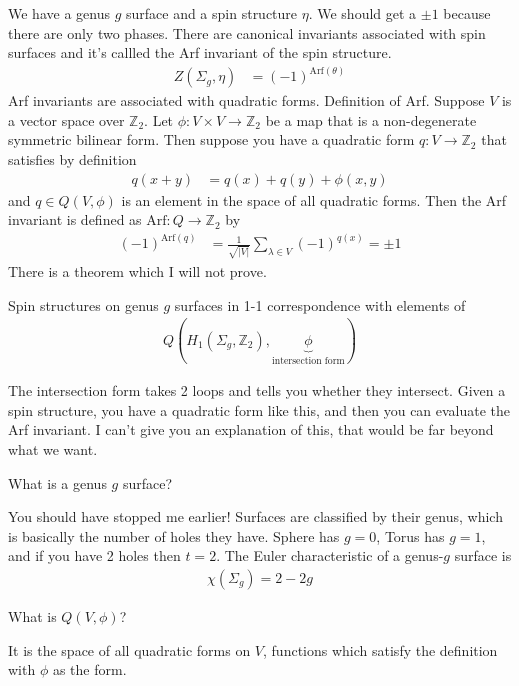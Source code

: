 We have a genus $g$ surface and a spin structure $\eta$.
We should get a $\pm 1$ because there are only two phases.
There are canonical invariants associated with spin surfaces
and it's callled the Arf invariant of the spin structure.
\begin{align}
    Z\left( \Sigma_g, \eta \right) &= (-1)^{\mathrm{Arf}(\theta)}
\end{align}
Arf invariants are associated with quadratic forms.
Definition of Arf.
Suppose $V$ is a vector space over $\mathbb{Z}_2$.
Let $\phi: V\times V\to \mathbb{Z}_2$ be a map
that is a non-degenerate symmetric bilinear form.
Then suppose you have a quadratic form $q: V\to \mathbb{Z}_2$
that satisfies by definition
\begin{align}
    q(x + y) &= q(x) + q(y) + \phi(x, y)
\end{align}
and $q\in Q(V, \phi)$ is an element in the space of all quadratic forms.
Then the Arf invariant is defined as $\mathrm{Arf}:Q\to\mathbb{Z}_2$
by
\begin{align}
    (-1)^{\textrm{Arf}(q)} &=
    \frac{1}{\sqrt{|V|}}
    \sum_{\lambda\in V} (-1)^{q(x)}
    = \pm 1
\end{align}
There is a theorem which I will not prove.
\begin{theorem}
    Spin structures on genus $g$ surfaces in 1-1 correspondence with elements of
    \begin{align}
        Q\left(
        H_1\left( \Sigma_g, \mathbb{Z}_2 \right),
        \underbrace{\phi}_{\text{intersection form}}
        \right)
    \end{align}
\end{theorem}
The intersection form takes 2 loops and tells you whether they intersect.
Given a spin structure,
you have a quadratic form like this,
and then you can evaluate the Arf invariant.
I can't give you an explanation of this,
that would be far beyond what we want.

\begin{question}
    What is a genus $g$ surface?
\end{question}
You should have stopped me earlier!
Surfaces are classified by their genus,
which is basically the number of holes they have.
Sphere has $g=0$,
Torus has $g=1$,
and if you have 2 holes then $t=2$.
The Euler characteristic of a genus-$g$ surface is
\begin{align}
    \chi(\Sigma_g) = 2 - 2g
\end{align}

\begin{question}
    What is $Q(V,\phi)$?
\end{question}
It is the space of all quadratic forms on $V$,
functions which satisfy the definition with $\phi$ as the form.

